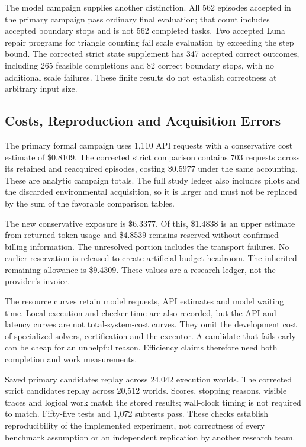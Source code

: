 \documentclass[conference]{IEEEtran}
\begin{document}
The model campaign supplies another distinction. All 562 episodes accepted in the primary campaign pass ordinary final evaluation; that count includes accepted boundary stops and is not 562 completed tasks. Two accepted Luna repair programs for triangle counting fail scale evaluation by exceeding the step bound. The corrected strict state supplement has 347 accepted correct outcomes, including 265 feasible completions and 82 correct boundary stops, with no additional scale failures. These finite results do not establish correctness at arbitrary input size.

\subsection{Costs, Reproduction and Acquisition Errors}
The primary formal campaign uses 1,110 API requests with a conservative cost estimate of \$0.8109. The corrected strict comparison contains 703 requests across its retained and reacquired episodes, costing \$0.5977 under the same accounting. These are analytic campaign totals. The full study ledger also includes pilots and the discarded environmental acquisition, so it is larger and must not be replaced by the sum of the favorable comparison tables.

The new conservative exposure is \$6.3377. Of this, \$1.4838 is an upper estimate from returned token usage and \$4.8539 remains reserved without confirmed billing information. The unresolved portion includes the transport failures. No earlier reservation is released to create artificial budget headroom. The inherited remaining allowance is \$9.4309. These values are a research ledger, not the provider's invoice.

The resource curves retain model requests, API estimates and model waiting time. Local execution and checker time are also recorded, but the API and latency curves are not total-system-cost curves. They omit the development cost of specialized solvers, certification and the executor. A candidate that fails early can be cheap for an unhelpful reason. Efficiency claims therefore need both completion and work measurements.

Saved primary candidates replay across 24,042 execution worlds. The corrected strict candidates replay across 20,512 worlds. Scores, stopping reasons, visible traces and logical work match the stored results; wall-clock timing is not required to match. Fifty-five tests and 1,072 subtests pass. These checks establish reproducibility of the implemented experiment, not correctness of every benchmark assumption or an independent replication by another research team.
\end{document}
